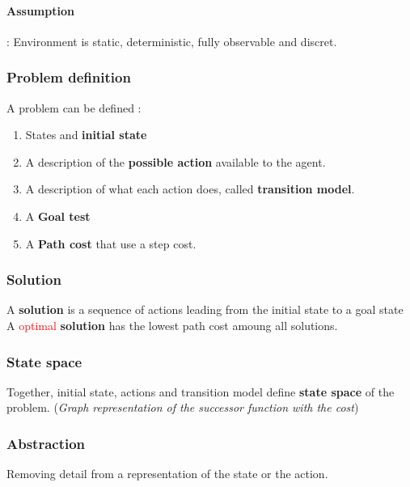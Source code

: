 \paragraph{Assumption} : Environment is  static, deterministic, fully
observable and discret.

\subsubsection{Problem definition}
A problem can be defined :
\begin{enumerate}
    \item States and \textbf{initial state}
    \item A description of the  \textbf{possible action} available to the
    agent. 
    \item A description of what each action does, called \textbf{transition
        model}. 
    \item A \textbf{Goal test}
    \item A \textbf{Path cost} that use a step cost.
\end{enumerate}

\subsubsection{Solution} 
A  \textbf{solution}  is a  sequence  of actions  leading
from  the  initial state  to  a  goal state  A  \textcolor{red}{optimal}
\textbf{solution} has the lowest path cost amoung all solutions.

\subsubsection{State space}
Together,   initial  state,   actions   and   transition  model   define
\textbf{state space}  of the  problem. (\textit{Graph  representation of
the successor function with the cost})

\subsubsection{Abstraction}
Removing detail from a representation of the state or the action.

